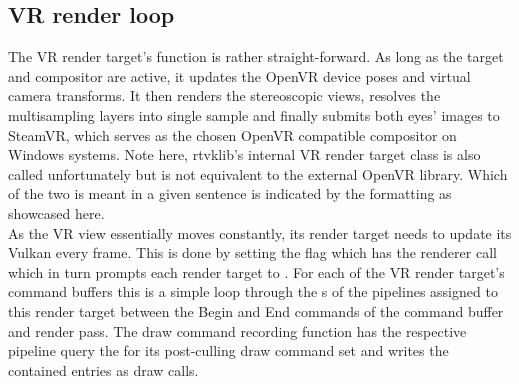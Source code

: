 \subsection{VR render loop}
The \gls{VR} render target's  function is rather straight-forward. 
As long as the target and compositor are active, it updates the \gls{OpenVR} device poses and virtual camera transforms. It then renders the stereoscopic views, resolves the multisampling layers into single sample and finally submits both eyes' images to SteamVR, which serves as the chosen \gls{OpenVR} compatible compositor on Windows systems. Note here, \gls{rtvklib}'s internal \gls{VR} render target class is also called  unfortunately but is not equivalent to the external \gls{OpenVR} library. Which of the two is meant in a given sentence is indicated by the formatting as showcased here. \\
As the \gls{VR} view essentially moves constantly, its render target needs to update its Vulkan  every frame. This is done by setting the  flag which has the renderer call  which in turn prompts each render target to . For each of the \gls{VR} render target's command buffers this is a simple loop through the s of the pipelines assigned to this render target between the Begin and End commands of the command buffer and render pass. The draw command recording function has the respective pipeline query the  for its post-culling draw command set and writes the contained entries as  draw calls. 

